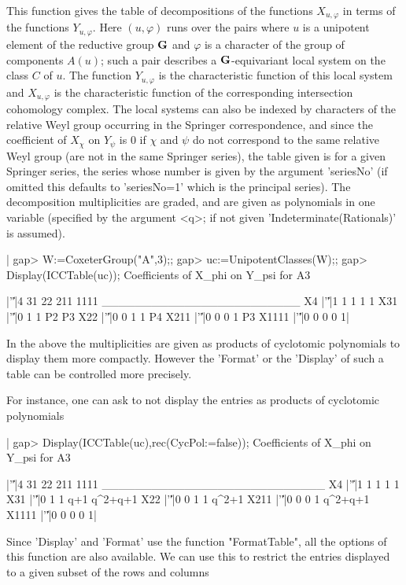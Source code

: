 This  function  gives  the  table  of  decompositions  of  the  functions $
X_{u,\varphi}$   in   terms   of   the   functions   $Y_{u,\varphi}$.  Here
$(u,\varphi)$  runs over the pairs where $u$  is a unipotent element of the
reductive  group  ${\bf G}$  and  $\varphi$  is  a  character  of  the group of
components  $A(u)$; such a pair  describes a ${\bf G}$-equivariant local system
on the class $C$ of $u$. The function $Y_{u,\varphi}$ is the characteristic
function  of this  local system  and $X_{u,\varphi}$  is the characteristic
function  of the  corresponding intersection  cohomology complex. The local
systems  can  also  be  indexed  by  characters  of the relative Weyl group
occurring  in  the  Springer  correspondence,  and since the coefficient of
$X_\chi$  on $Y_\psi$ is $0$ if $\chi$  and $\psi$ do not correspond to the
same  relative Weyl group (are not in  the same Springer series), the table
given  is for a given Springer series,  the series whose number is given by
the  argument 'seriesNo' (if omitted this defaults to 'seriesNo=1' which is
the principal series). The decomposition multiplicities are graded, and are
given as polynomials in one variable (specified by the argument <q>; if not
given 'Indeterminate(Rationals)' is assumed).

|    gap> W:=CoxeterGroup("A",3);;
    gap> uc:=UnipotentClasses(W);;
    gap> Display(ICCTable(uc));
    Coefficients of X_phi on Y_psi for A3

          |'\|'|4 31 22 211 1111
    ________________________
    X4    |'\|'|1  1  1   1    1
    X31   |'\|'|0  1  1  P2   P3
    X22   |'\|'|0  0  1   1   P4
    X211  |'\|'|0  0  0   1   P3
    X1111 |'\|'|0  0  0   0    1|

In  the  above  the  multiplicities  are  given  as  products of cyclotomic
polynomials  to display  them more  compactly. However  the 'Format' or the
'Display'   of  such  a  table  can   be  controlled  more  precisely.

For  instance,  one  can  ask  to  not  display  the entries as products of
cyclotomic polynomials\:

|    gap> Display(ICCTable(uc),rec(CycPol:=false));
    Coefficients of X_phi on Y_psi for A3

          |'\|'|4 31 22 211    1111
    ___________________________
    X4    |'\|'|1  1  1   1       1
    X31   |'\|'|0  1  1 q+1 q^2+q+1
    X22   |'\|'|0  0  1   1   q^2+1
    X211  |'\|'|0  0  0   1 q^2+q+1
    X1111 |'\|'|0  0  0   0       1|

Since  'Display'  and  'Format'  use  the  function  "FormatTable", all the
options  of this function are  also available. We can  use this to restrict
the entries displayed to a given subset of the rows and columns\:

